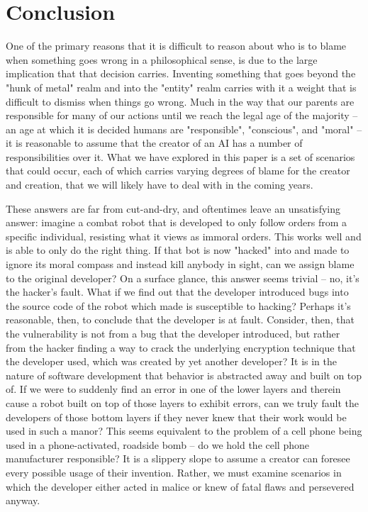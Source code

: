 \documentclass[12]{article}
\begin{document}
\section{Conclusion}
	One of the primary reasons that it is difficult to reason about who is to blame when something goes wrong in a philosophical sense, is due to the large implication that that decision carries. Inventing something that goes beyond the "hunk of metal" realm and into the "entity" realm carries with it a weight that is difficult to dismiss when things go wrong. Much in the way that our parents are responsible for many of our actions until we reach the legal age of the majority -- an age at which it is decided humans are "responsible", "conscious", and "moral" -- it is reasonable to assume that the creator of an AI has a number of responsibilities over it. What we have explored in this paper is a set of scenarios that could occur, each of which carries varying degrees of blame for the creator and creation, that we will likely have to deal with in the coming years.
	
	These answers are far from cut-and-dry, and oftentimes leave an unsatisfying answer: imagine a combat robot that is developed to only follow orders from a specific individual, resisting what it views as immoral orders. This works well and is able to only do the right thing. If that bot is now "hacked" into and made to ignore its moral compass and instead kill anybody in sight, can we assign blame to the original developer? On a surface glance, this answer seems trivial -- no, it's the hacker's fault. What if we find out that the developer introduced bugs into the source code of the robot which made is susceptible to hacking? Perhaps it's reasonable, then, to conclude that the developer is at fault. Consider, then, that the vulnerability is not from a bug that the developer introduced, but rather from the hacker finding a way to crack the underlying encryption technique that the developer used, which was created by yet another developer? It is in the nature of software development that behavior is abstracted away and built on top of. If we were to suddenly find an error in one of the lower layers and therein cause a robot built on top of those layers to exhibit errors, can we truly fault the developers of those bottom layers if they never knew that their work would be used in such a manor? This seems equivalent to the problem of a cell phone being used in a phone-activated, roadside bomb -- do we hold the cell phone manufacturer responsible? It is a slippery slope to assume a creator can foresee every possible usage of their invention. Rather, we must examine scenarios in which the developer either acted in malice or knew of fatal flaws and persevered anyway. 
	
\end{document}
